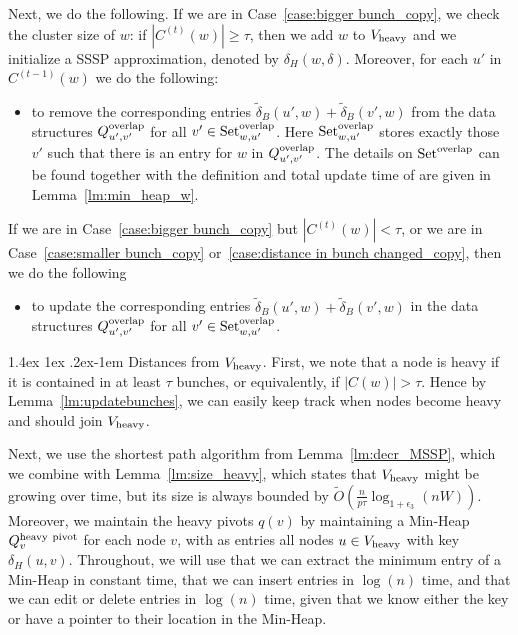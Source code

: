 \documentclass[11pt]{article}
\makeatletter
\theoremstyle{definition}
\theoremstyle{remark}
\renewcommand{\paragraph}{%
  \@startsection{paragraph}{4}%
  {\z@}{1.4ex \@plus 1ex \@minus .2ex}{-1em}%
  {\normalfont\normalsize\bfseries}%
}
\makeatother
\begin{document}
    Next, we do the following. 
    If we are in Case~\ref{case:bigger bunch_copy}, we check the cluster size of $w$: if $|C^{(t)}(w)|\geq\tau$, then we add $w$ to $V_{\rm{heavy}}$ and we initialize a SSSP approximation, denoted by $\delta_H(w,\delta)$. Moreover, for each $u'$ in $C^{(t-1)}(w)$ we do the following:
\begin{itemize}
    \item {} to remove the corresponding entries $\tilde\delta_B(u',w)+\tilde\delta_B(v',w)$ from the data structures $Q^{\rm{overlap}}_{u',v'}$ for all $v'\in \text{Set}^{\rm{overlap}}_{w,u'}$. Here $\text{Set}^{\rm{overlap}}_{w,u'}$ stores exactly those $v'$ such that there is an entry for $w$ in $Q^{\rm{overlap}}_{u',v'}$. The details on $\text{Set}^{\rm{overlap}}$ can be found together with the definition and total update time of \UpdateOverlapDS are given in Lemma~\ref{lm:min_heap_w}.
\end{itemize}

If we are in Case~\ref{case:bigger bunch_copy} but $|C^{(t)}(w)|<\tau$, or we are in Case~\ref{case:smaller bunch_copy} or~\ref{case:distance in bunch changed_copy}, then we do the following
\begin{itemize}
    \item {} to update the corresponding entries $\tilde\delta_B(u',w)+\tilde\delta_B(v',w)$ in the data structures $Q^{\rm{overlap}}_{u',v'}$ for all $v'\in \text{Set}^{\rm{overlap}}_{w,u'}$. 
\end{itemize}


\paragraph{Distances from $ V_{\rm{heavy}} $.}
First, we note that a node is heavy if it is contained in at least $\tau$ bunches, or equivalently, if $|C(w)|>\tau$. Hence by Lemma~\ref{lm:updatebunches}, we can easily keep track when nodes become heavy and should join $V_{\rm{heavy}}$. 

Next, we use the shortest path algorithm from Lemma~\ref{lm:decr_MSSP}, which we combine with Lemma~\ref{lm:size_heavy}, which states that $V_{\rm{heavy}}$ might be growing over time, but its size is always bounded by $ \tilde O (\tfrac{n }{p\tau}\log_{1+\epsilon_3}(nW)) $. 
Moreover, we maintain the heavy pivots $q(v)$ by maintaining a Min-Heap $Q^{\rm{heavy~pivot}}_v$ for each node $v$, with as entries all nodes $u\in V_{\rm{heavy}}$ with key $\delta_H(u,v)$. Throughout, we will use that we can extract the minimum entry of a Min-Heap in constant time, that we can insert entries in $\log(n)$ time, and that we can edit or delete entries in $\log(n)$ time, given that we know either the key or have a pointer to their location in the Min-Heap. 
\end{document}
